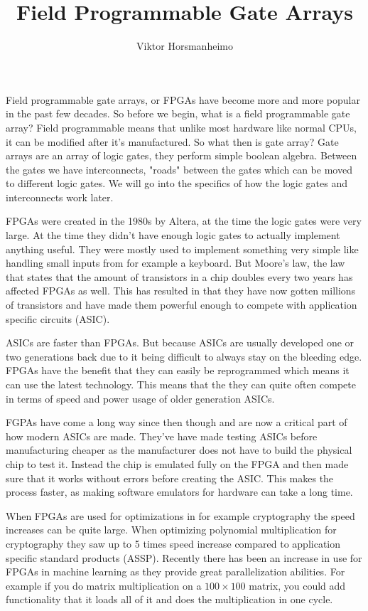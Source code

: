\documentclass{paper}
\title{Field Programmable Gate Arrays} \author{Viktor Horsmanheimo}
\begin{document}
\maketitle

Field programmable gate arrays, or FPGAs have become more and more popular in
the past few decades. So before we begin, what is a field programmable gate
array? Field programmable means that unlike most hardware like normal CPUs, it
can be modified after it's manufactured. So what then is gate array? Gate
arrays are an array of logic gates, they perform simple boolean algebra.
Between the gates we have interconnects, "roads" between the gates which can be
moved to different logic gates. We will go into the specifics of how the logic
gates and interconnects work later.

FPGAs were created in the 1980s by Altera\cite{inthebeginning}, at the time the
logic gates were very large. At the time they didn't have enough logic gates to
actually implement anything useful. They were mostly used to implement
something very simple like handling small inputs from for example a keyboard.
But Moore's law, the law that states that the amount of transistors in a chip
doubles every two years has affected FPGAs as well. This has resulted in that
they have now gotten millions of transistors and have made them powerful enough
to compete with application specific circuits (ASIC).

ASICs are faster than FPGAs. But because ASICs are usually developed one or two
generations back due to it being difficult to always stay on the bleeding edge.
FPGAs have the benefit that they can easily be reprogrammed which means it can
use the latest technology. This means that the they can quite often compete in
terms of speed and power usage of older generation ASICs.

FGPAs have come a long way since then though and are now a critical part of how
modern ASICs are made. They've have made testing ASICs before manufacturing
cheaper \cite{kuon2008fpga} as the manufacturer does not have to build the
physical chip to test it. Instead the chip is emulated fully on the FPGA and
then made sure that it works without errors before creating the ASIC. This
makes the process faster, as making software emulators for hardware can take a
long time.

When FPGAs are used for optimizations in for example cryptography the speed
increases can be quite large. When optimizing polynomial multiplication for
cryptography they saw up to 5 times speed increase compared to application
specific standard products (ASSP)\cite{polynomialmultiplication}. Recently
there has been an increase in use for FPGAs in machine learning
\cite{hardwarecarvision}\cite{mafia} as they provide great parallelization
abilities. For example if you do matrix multiplication on a $100\times 100$
matrix, you could add functionality that it loads all of it and does the
multiplication in one cycle.
\newpage
\end{document}
